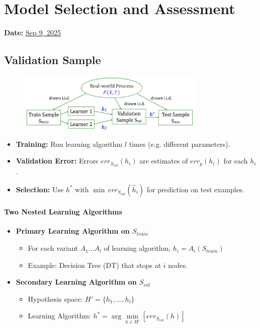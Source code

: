 \section{Model Selection and Assessment}
\textbf{Date:} \underline{Sep 9, 2025}

\subsection{Validation Sample}

\begin{figure}[h]
    \centering
    \includegraphics[width=0.8\textwidth]{Images/validation_sample.png}
\end{figure}
\begin{itemize}
    \item \textbf{Training:} Run learning algorithm $l$ times (e.g. different parameters).
    \item \textbf{Validation Error:} Errors $err_{S_{val}}(h_i)$ are estimates of $err_{p}(h_i)$ for each $h_i$.
    \item \textbf{Selection:} Use $h^*$ with $\min\, err_{S_{val}}(\hat{h}_i)$ for prediction on test examples.
\end{itemize}

\paragraph{Two Nested Learning Algorithms}
\begin{itemize}
    \item \textbf{Primary Learning Algorithm on $S_{train}$}
    \begin{itemize}
        \item For each variant $A_1 \ldots A_l$ of learning algorithm, $h_i = A_i(S_{train})$
        \item Example: Decision Tree (DT) that stops at $i$ nodes.
    \end{itemize}
    \item \textbf{Secondary Learning Algorithm on $S_{val}$}
    \begin{itemize}
        \item Hypothesis space: $H' = \{h_1, \ldots, h_l\}$
        \item Learning Algorithm: $h^* = \arg\min\limits_{h \in H'} \left[ err_{S_{val}}(h) \right]$
    \end{itemize}
\end{itemize}

